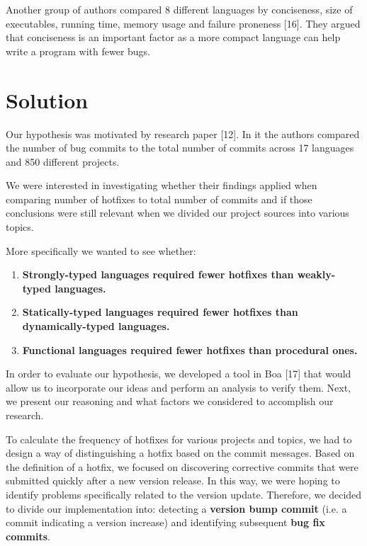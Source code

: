 Another group of authors compared 8 different languages by conciseness, size of executables, running time, memory usage and failure proneness [16]. They argued that conciseness is an important factor as a more compact language can help write a program with fewer bugs.


\section{Solution}
Our hypothesis was motivated by research paper [12]. In it the authors compared the number of bug commits to the total number of commits across 17 languages and 850 different projects.\par

We were interested in investigating whether their findings applied when comparing number of hotfixes to total number of commits and if those conclusions were still relevant when we divided our project sources into various topics.\par

More specifically we wanted to see whether:
\begin{enumerate}
\item \textbf{Strongly-typed languages required fewer hotfixes than weakly-typed languages.}
\item \textbf{Statically-typed languages required fewer hotfixes than dynamically-typed languages.}
\item \textbf{Functional languages required fewer hotfixes than procedural ones.}
\end{enumerate}
\par
In order to evaluate our hypothesis, we developed a tool in Boa [17] that would allow us to incorporate our ideas and perform an analysis to verify them. Next, we present our reasoning and what factors we considered to accomplish our research.\par

To calculate the frequency of hotfixes for various projects and topics, we had to design a way of distinguishing a hotfix based on the commit messages. Based on the definition of a hotfix, we focused on discovering corrective commits that were submitted quickly after a new version release. In this way, we were hoping to identify problems specifically related to the version update. Therefore, we decided to divide our implementation into: detecting a \textbf{version bump commit} (i.e. a commit indicating a version increase) and identifying subsequent \textbf{bug fix commits}.\par

